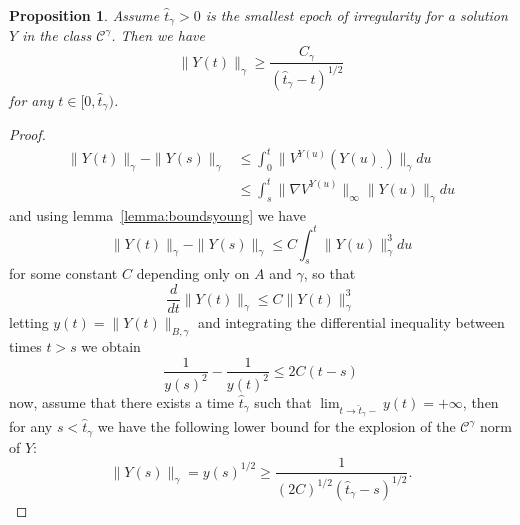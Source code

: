 \documentclass[a4paper,12pt,reqno]{amsart}
\newtheorem{proposition}{Proposition}
\newcommand{\CC}{\mathscr{C}}
\begin{document}
\begin{proposition}
\label{prop:blowup}
Assume $\hat t_\gamma> 0$ is the smallest epoch of irregularity for a solution $Y$ in the class $\CC^\gamma$. Then we have
\begin{equation}
  \label{eq:blowup}
  \|Y(t)\|_{\gamma} \ge \frac{C_\gamma}{(\hat t_\gamma - t)^{1/2}}
\end{equation}
for any $t \in [0,\hat t_\gamma)$.
\end{proposition}
\begin{proof}
\begin{equation}
\label{eq:V-estimate}
  \begin{split}
\|Y(t)\|_\gamma - \|Y(s)\|_\gamma & \le \int_0^t
\|V^{Y(u)}(Y(u)_\cdot)\|_\gamma du
\\ &      \le \int_s^t \|\nabla V^{Y(u)}\|_\infty
\|Y(u)\|_\gamma du
  \end{split}
\end{equation}
and using lemma~\ref{lemma:boundsyoung} we have
\begin{equation*}
\|Y(t)\|_\gamma - \|Y(s)\|_\gamma
   \le C \int_s^t \|Y(u)\|^3_\gamma du
\end{equation*}
for some constant $C$ depending only on $A$ and $\gamma$, so that
\begin{equation*}
\frac{d}{dt} \|Y(t)\|_\gamma     \le  C\|Y(t)\|^3_\gamma
\end{equation*}
letting $y(t) = \|Y(t)\|_{B,\gamma}$ and integrating the
differential inequality between times $t>s$ we obtain
$$
\frac{1}{y(s)^2}-\frac{1}{y(t)^2} \le 2 C  (t-s)
$$
now, assume that there exists a time $\hat{t}_\gamma$ such that $\lim_{t\to
  \hat t_\gamma -} y(t) = +\infty$, then for any $s < \hat{t}_\gamma$ we have the
following lower bound for the explosion of the $\CC^\gamma$ norm of $Y$:
$$
\|Y(s)\|_{\gamma} = y(s)^{1/2} \ge \frac{1}{(2C)^{1/2} (\hat t_\gamma - s)^{1/2}}.
$$
\end{proof}
\end{document}
